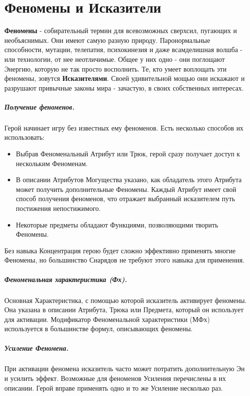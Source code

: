 \chapter{Феномены и Исказители}
\textbf{Феномены} - собирательный термин для всевозможных сверхсил, пугающих и необъяснимых. Они имеют самую разную природу. Паронормальные способности, мутации, телепатия, психокинезия и даже всамделишная волшба - или технологии, от нее неотличимые. Общее у них одно - они поглощают Энергию, которую не так просто восполнить. Те, кто умеет воплощать эти феномены, зовутся \textbf{Исказителями}. Своей удивительной мощью они искажают и разрушают привычные законы мира - зачастую, в своих собственных интересах.
\paragraph{Получение феноменов.} Герой начинает игру без известных ему феноменов. Есть несколько способов их использовать:
\begin{itemize}
  \item Выбрав Феноменальный Атрибут или Трюк, герой сразу получает доступ к нескольким Феноменам.
  \item В описании Атрибутов Могущества указано, как обладатель этого Атрибута может получить дополнительные Феномены.
    \newline Каждый Атрибут имеет свой способ получения феноменов, что отражает выбранный исказителем путь постижения непостижимого.
  \item Некоторые предметы обладают Функциями, позволяющими творить Феномены.
\end{itemize}
\begin{tcolorbox}
  Без навыка Концентрация герою будет сложно эффективно применять многие Феномены, но большинство Снарядов не требуют этого навыка для применения.
\end{tcolorbox}
\paragraph{Феноменальная характеристика (Фх).} Основная Характеристика, с помощью которой исказитель активирует феномены. Она указана в описании Атрибута, Трюка или Предмета, который он использует для активации. Модификатор Феноменальной характеристики (МФх) используется в большинстве формул, описывающих феномены.
\paragraph{Усиление Феномена.} При активации феномена исказитель часто может потратить дополнительную Эн и усилить эффект. Возможные для феноменов Усиления перечислены в их описании. Герой вправе применять одно и то же Усиление несколько раз.
